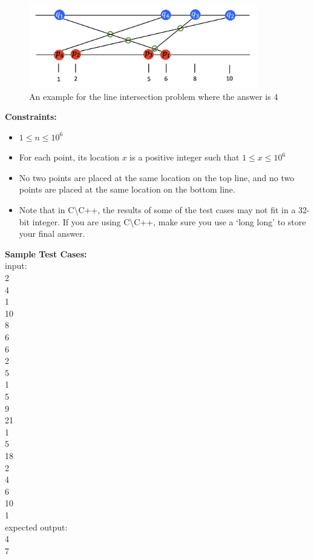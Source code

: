 \documentclass[solutionorbox, answers]{exam}
\begin{document}
\begin{questions}
\begin{figure}[h]
\begin{center}
\includegraphics[width=10cm]{input.png}
\caption{An example for the line intersection problem where the answer is 4}
\label{fig:input}
\end{center}
\end{figure}

\medskip
\noindent\textbf{Constraints:}
\begin{itemize}[noitemsep,topsep=0pt]
    \item $1 \leq n \leq 10^6$
    \item For each point, its location $x$ is a positive integer such that $1 \leq x \leq 10^6$
    \item No two points are placed at the same location on the top line, and no two points are placed at the same location on the bottom line.
    \item Note that in C\textbackslash C++, the results of some of the test cases may not fit in a 32-bit integer. If you are using C\textbackslash C++, make sure you use a `long long' to store your final answer.
\end{itemize}


\newpage
\noindent\textbf{Sample Test Cases:} \\

\noindent input:
\\2 \\ 4 \\ 1 \\ 10 \\ 8 \\ 6 \\ 6 \\ 2 \\ 5 \\ 1 \\ 5 \\ 9 \\ 21 \\ 1 \\ 5 \\ 18 \\ 2 \\ 4 \\ 6 \\ 10 \\ 1 \\

\noindent expected output: \\ 4 \\ 7

\end{questions}
\end{document}
